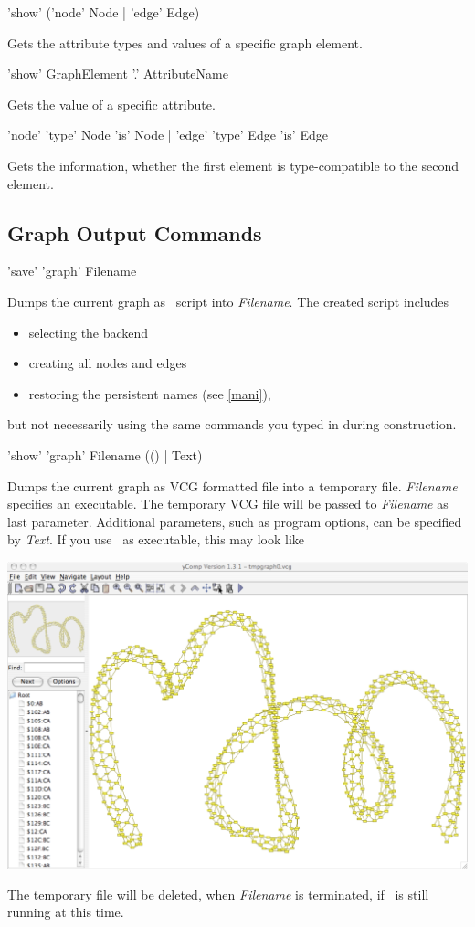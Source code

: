 \begin{rail}
 'show' ('node' Node | 'edge' Edge)
\end{rail}
Gets the attribute types and values of a specific graph element.

\begin{rail}
  'show' GraphElement '.' AttributeName
\end{rail}
Gets the value of a specific attribute.

\begin{rail}
  'node' 'type' Node 'is' Node | 'edge' 'type' Edge 'is' Edge
\end{rail}
Gets the information, whether the first element is type-compatible to the second element.

\subsection{Graph Output Commands}
\label{outputcmds}

\begin{rail}
  'save' 'graph' Filename
\end{rail}
Dumps the current graph as \GrShell\ script into \emph{Filename}. The created script includes
\begin{itemize}
  \item selecting the backend
  \item creating all nodes and edges
  \item restoring the persistent names (see \ref{mani}),
\end{itemize}
but not necessarily using the same commands you typed in during construction.

\begin{rail}
  'show' 'graph' Filename (() | Text)
\end{rail}
Dumps the current graph as VCG formatted file into a temporary file. \emph{Filename} specifies an executable. The temporary VCG file will be passed to \emph{Filename} as last parameter. Additional parameters, such as program options, can be specified by \emph{Text}. If you use \yComp\ as executable, this may look like
\begin{center}
  \includegraphics[width=0.75\linewidth]{fig/showgraph}
\end{center}  
The temporary file will be deleted, when \emph{Filename} is terminated, if \GrShell\ is still running at this time.

